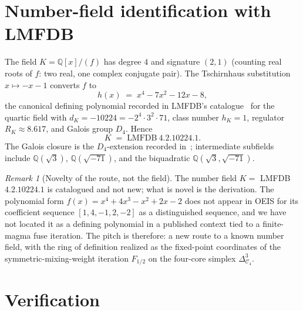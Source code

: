 \documentclass[11pt,reqno]{amsart}
\theoremstyle{plain}
\theoremstyle{definition}
\theoremstyle{remark}
\newtheorem*{remark}{Remark}
\newcommand{\Q}{\mathbb{Q}}
\newcommand{\Cfour}{\mathcal{C}_{4}}
\begin{document}
\section{Number-field identification with LMFDB}
\label{sec:lmfdb}

The field $K = \Q[x]/(f)$ has degree $4$ and signature $(2, 1)$
(counting real roots of $f$: two real, one complex conjugate pair).
The Tschirnhaus substitution $x \mapsto -x - 1$ converts $f$ to
\[
  h(x) \;=\; x^{4} - 7x^{2} - 12x - 8,
\]
the canonical defining polynomial recorded in LMFDB's
catalogue~\cite{LMFDB-4-2-10224-1} for the quartic field with
$d_{K} = -10224 = -2^{4}\cdot 3^{2}\cdot 71$, class number $h_{K} = 1$,
regulator $R_{K} \approx 8.617$, and Galois group $D_{4}$. Hence
\[
  K \;=\; \text{LMFDB}~4.2.10224.1.
\]
The Galois closure is the $D_{4}$-extension recorded
in~\cite{LMFDB-8-0-526936617216-1}; intermediate subfields include
$\Q(\sqrt{3})$, $\Q(\sqrt{-71})$, and the biquadratic
$\Q(\sqrt{3}, \sqrt{-71})$.

\begin{remark}[Novelty of the route, not the field]
The number field $K = $ LMFDB~$4.2.10224.1$ is catalogued and not new;
what is novel is the derivation. The polynomial form
$f(x) = x^{4} + 4x^{3} - x^{2} + 2x - 2$ does not appear in OEIS for
its coefficient sequence $[1, 4, -1, 2, -2]$ as a distinguished
sequence, and we have not located it as a defining polynomial in a
published context tied to a finite-magma fuse iteration. The pitch is
therefore: a new route to a known number field, with the ring of
definition realized as the fixed-point coordinates of the
symmetric-mixing-weight iteration $F_{1/2}$ on the four-core simplex
$\Delta^{3}_{\Cfour}$.
\end{remark}

\section{Verification}
\label{sec:verification}
\end{document}
